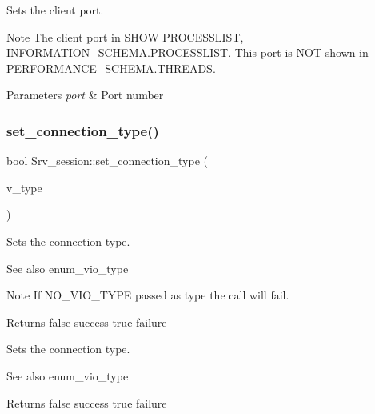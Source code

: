 Sets the client port.

\begin{DoxyNote}{Note}
The client port in S\+H\+OW P\+R\+O\+C\+E\+S\+S\+L\+I\+ST, I\+N\+F\+O\+R\+M\+A\+T\+I\+O\+N\+\_\+\+S\+C\+H\+E\+M\+A.\+P\+R\+O\+C\+E\+S\+S\+L\+I\+ST. This port is N\+OT shown in P\+E\+R\+F\+O\+R\+M\+A\+N\+C\+E\+\_\+\+S\+C\+H\+E\+M\+A.\+T\+H\+R\+E\+A\+DS.
\end{DoxyNote}

\begin{DoxyParams}{Parameters}
{\em port} & Port number \\
\hline
\end{DoxyParams}
\mbox{\label{classSrv__session_a93957a74e9e34a490425cd03de471650}} 
\subsubsection{\texorpdfstring{set\+\_\+connection\+\_\+type()}{set\_connection\_type()}}
{\footnotesize\ttfamily bool Srv\+\_\+session\+::set\+\_\+connection\+\_\+type (\begin{DoxyParamCaption}\item[{enum\+\_\+vio\+\_\+type}]{v\+\_\+type }\end{DoxyParamCaption})}

Sets the connection type.

\begin{DoxySeeAlso}{See also}
enum\+\_\+vio\+\_\+type
\end{DoxySeeAlso}
\begin{DoxyNote}{Note}
If N\+O\+\_\+\+V\+I\+O\+\_\+\+T\+Y\+PE passed as type the call will fail.
\end{DoxyNote}
\begin{DoxyReturn}{Returns}
false success true failure
\end{DoxyReturn}
Sets the connection type.

\begin{DoxySeeAlso}{See also}
enum\+\_\+vio\+\_\+type
\end{DoxySeeAlso}
\begin{DoxyReturn}{Returns}
false success true failure 
\end{DoxyReturn}
\mbox{\label{classSrv__session_a7a2ece559dacfdff32131e36e45eecd1}} 
